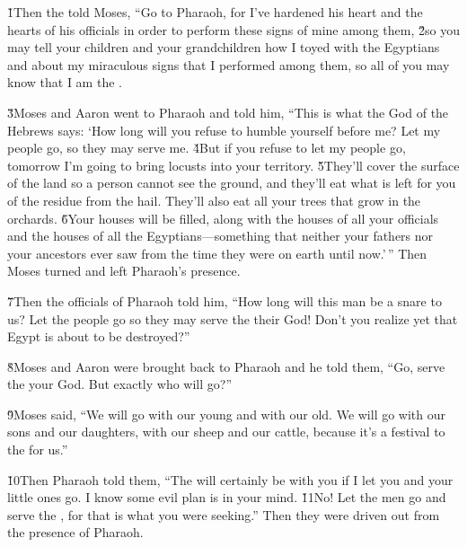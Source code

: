\v{1}Then the  told Moses, ``Go to Pharaoh, for I've hardened his heart and the hearts of his officials in order to perform these signs of mine among them, \v{2}so you may tell your children and your grandchildren how I toyed with the Egyptians and about my miraculous signs that I performed among them, so all of you may know that I am the .

\v{3}Moses and Aaron went to Pharaoh and told him, ``This is what the  God of the Hebrews says: `How long will you refuse to humble yourself before me? Let my people go, so they may serve me. \v{4}But if you refuse to let my people go, tomorrow I'm going to bring locusts into your territory. \v{5}They'll cover the surface of the land so a person cannot see the ground, and they'll eat what is left for you of the residue from the hail. They'll also eat all your trees that grow in the orchards. \v{6}Your houses will be filled, along with the houses of all your officials and the houses of all the Egyptians---something that neither your fathers nor your ancestors ever saw from the time they were on earth until now.'\,'' Then Moses turned and left Pharaoh's presence.

\v{7}Then the officials of Pharaoh told him, ``How long will this man be a snare to us? Let the people go so they may serve the  their God! Don't you realize yet that Egypt is about to be destroyed?''

\v{8}Moses and Aaron were brought back to Pharaoh and he told them, ``Go, serve the  your God. But exactly who will go?''

\v{9}Moses said, ``We will go with our young and with our old. We will go with our sons and our daughters, with our sheep and our cattle, because it's a festival to the  for us.''

\v{10}Then Pharaoh told them, ``The  will certainly be with you if I let you and your little ones go. I know some evil plan is in your mind. \v{11}No! Let the men go and serve the , for that is what you were seeking.'' Then they were driven out from the presence of Pharaoh.

